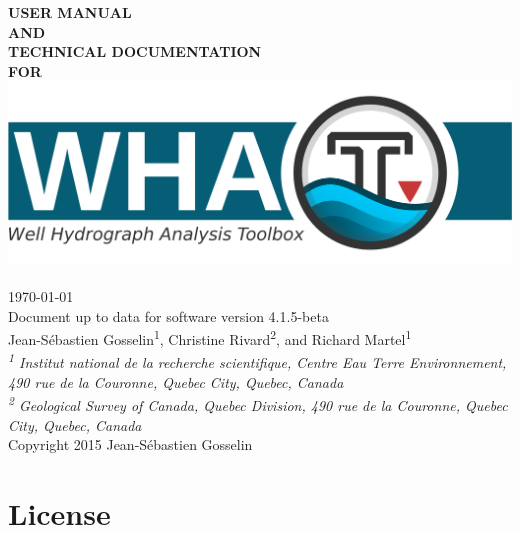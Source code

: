 \documentclass[12pt, letterpaper, fleqn]{report}
\begin{document}
\begin{titlepage}
\begin{center}


\textbf{\fontsize{30}{36}\selectfont USER MANUAL}\\[1.0cm]
\textbf{\fontsize{30}{36}\selectfont AND}\\[1.0cm]
\textbf{\fontsize{30}{36}\selectfont TECHNICAL DOCUMENTATION}\\[1.0cm]
\textbf{\fontsize{30}{36}\selectfont FOR}\\

\includegraphics[width=1\textwidth]{WHAT_banner}~\\[2cm]

{\Large \today}\\[0.5cm]
{\Large Document up to data  for software version 4.1.5-beta}\\[2cm]

{\large Jean-S\'ebastien Gosselin\textsuperscript{1}, Christine Rivard\textsuperscript{2}, and Richard Martel\textsuperscript{1}}\\[0.25cm]

\textit{{\small\textsuperscript{1} Institut national de la recherche scientifique, Centre Eau Terre Environnement, 490 rue de la Couronne, Quebec City, Quebec, Canada}}\\[0.1cm]

\textit{{\small\textsuperscript{2} Geological Survey of Canada, Quebec Division, 490 rue de la Couronne, Quebec City, Quebec, Canada}}\\[2cm]

{Copyright 2015 Jean-S\'ebastien Gosselin}

\end{center}
\end{titlepage}


\chapter*{License}
\end{document}
